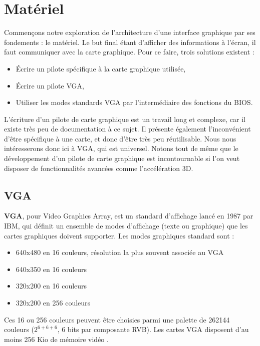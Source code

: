 \section{Matériel}
Commençons notre exploration de l'architecture d'une interface graphique par ses fondements : le matériel. Le but final étant d'afficher des informations à l'écran, il faut communiquer avec la carte graphique. Pour ce faire, trois solutions existent :
\begin{itemize} \vspace{1ex} \itemsep1ex
 \item Écrire un pilote spécifique à la carte graphique utilisée,
 \item Écrire un pilote VGA,
 \item Utiliser les modes standards VGA par l'intermédiaire des fonctions du BIOS.
\end{itemize}

\vspace{1em}
L'écriture d'un pilote de carte graphique est un travail long et complexe, car il existe très peu de documentation à ce sujet. Il présente également l'inconvénient d'être spécifique à une carte, et donc d'être très peu réutilisable. Nous nous intéresserons donc ici à VGA, qui est universel. Notons tout de même que le développement d'un pilote de carte graphique est incontournable si l'on veut disposer de fonctionnalités avancées comme l'accélération 3D.

\subsection{VGA}
\textbf{VGA}, pour Video Graphics Array, est un standard d'affichage lancé en 1987 par IBM, qui définit un ensemble de modes d'affichage (texte ou graphique) que les cartes graphiques doivent supporter. Les modes graphiques standard sont :
\begin{itemize} \vspace{1ex} \itemsep1ex
 \item 640x480 en 16 couleurs, résolution la plus souvent associée au VGA
 \item 640x350 en 16 couleurs
 \item 320x200 en 16 couleurs
 \item 320x200 en 256 couleurs
\end{itemize} \vspace{1ex}

Ces 16 ou 256 couleurs peuvent être choisies parmi une palette de 262144 couleurs ($2^{6+6+6}$, 6 bits par composante RVB). Les cartes VGA disposent d'au moins 256 Kio de mémoire vidéo \cite{FreeVGA}.\\

